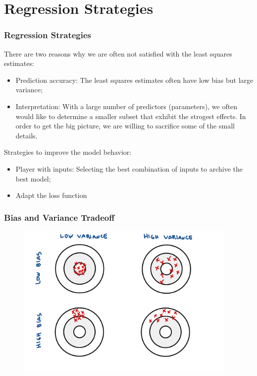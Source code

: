

\section{Regression Strategies}


\begin{frame}
    \frametitle{Regression Strategies}

    There are two reasons why we are often not satisfied with the least squares estimates:

    \begin{itemize}

        \item Prediction accuracy: The least squares estimates often have low bias but large variance;

        \item Interpretation: With a large number of predictors (parameters), we often would like to
        determine a smaller subset that exhibit the strogest effects. 
        In order to get the big picture, we are willing to sacrifice some of the small details.

    \end{itemize}

    Strategies to improve the model behavior:

    \begin{itemize}

        \item Player with inputs: Selecting the best combination of inputs to archive the best model;

        \item Adapt the loss function

    \end{itemize}

\end{frame}



\begin{frame}
    \frametitle{Bias and Variance Tradeoff}
    \begin{figure}
        \centering
        \includegraphics[width=0.95\textwidth]{sections/strategies/figures/bias_variance_tradeoff.pdf}
    \end{figure}
\end{frame}


